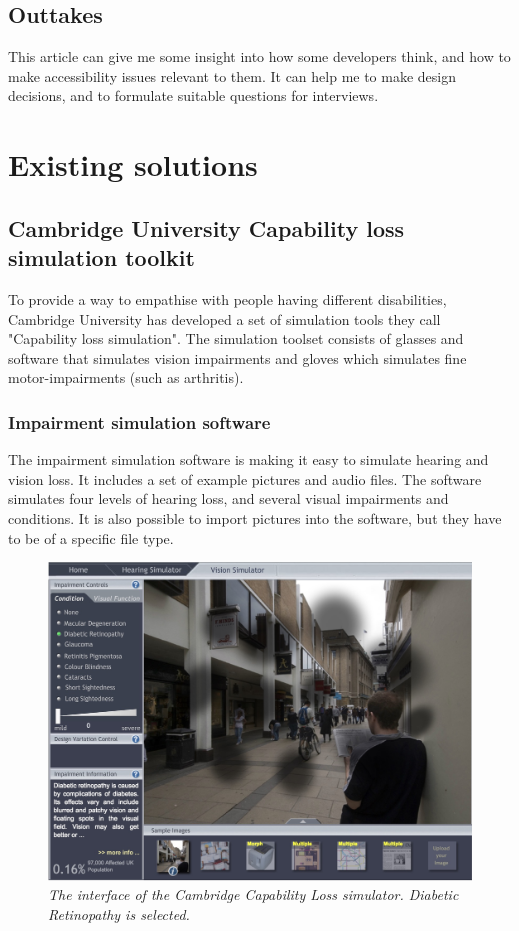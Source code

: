     \subsection{Outtakes} 
    This article can give me some insight into how some developers think, and how to make accessibility issues relevant to them. It can help me to make design decisions, and to formulate suitable questions for interviews.

\fi
\section{Existing solutions}
\subsection{Cambridge University Capability loss simulation toolkit}
To provide a way to empathise with people having different disabilities, Cambridge University has developed a set of simulation tools they call "Capability loss simulation". The simulation toolset consists of glasses and software that simulates vision impairments and gloves which simulates fine motor-impairments (such as arthritis).

\subsubsection{Impairment simulation software} \label{Impairment simulation software}
The impairment simulation software is making it easy to simulate hearing and vision loss. It includes a set of example pictures and audio files. The software simulates four levels of hearing loss, and several visual impairments and conditions. It is also possible to import pictures into the software, but they have to be of a specific file type. 

\begin{figure}[H]
  \includegraphics[width=\linewidth]{img/cambridge_simulator.jpg}
  \caption{\textit{The interface of the Cambridge Capability Loss simulator. Diabetic Retinopathy is selected.}}\label{fig:cambridge_simulator_interface}
\endminipage\hfill
\end{figure}

